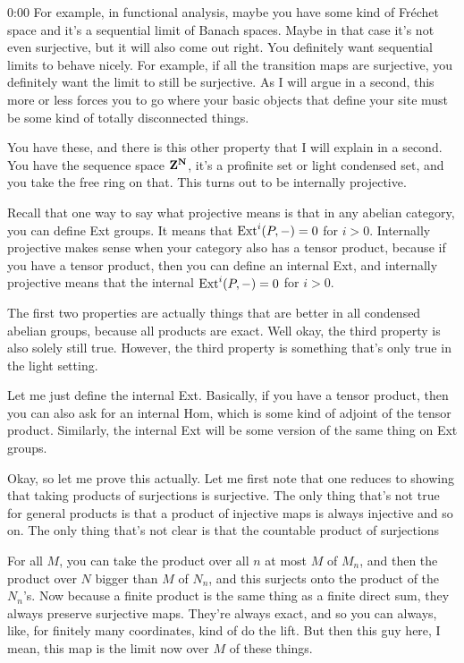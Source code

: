 \begin{unfinished}{0:00}
For example, in functional analysis, maybe you have some kind of Fréchet space and it's a sequential limit of Banach spaces. Maybe in that case it's not even surjective, but it will also come out right. You definitely want sequential limits to behave nicely. For example, if all the transition maps are surjective, you definitely want the limit to still be surjective. As I will argue in a second, this more or less forces you to go where your basic objects that define your site must be some kind of totally disconnected things.

You have these, and there is this other property that I will explain in a second. You have the sequence space $\mathbf Z^\mathbf N$, it's a profinite set or light condensed set, and you take the free ring on that. This turns out to be internally projective.

Recall that one way to say what projective means is that in any abelian category, you can define Ext groups. It means that $\operatorname{Ext}^i(P,-)=0$ for $i>0$. Internally projective makes sense when your category also has a tensor product, because if you have a tensor product, then you can define an internal Ext, and internally projective means that the internal $\operatorname{Ext}^i(P,-)=0$ for $i>0$.

The first two properties are actually things that are better in all condensed abelian groups, because all products are exact. Well okay, the third property is also solely still true. However, the third property is something that's only true in the light setting.

Let me just define the internal Ext. Basically, if you have a tensor product, then you can also ask for an internal Hom, which is some kind of adjoint of the tensor product. Similarly, the internal Ext will be some version of the same thing on Ext groups.

Okay, so let me prove this actually. Let me first note that one reduces to showing that taking products of surjections is surjective. The only thing that's not true for general products is that a product of injective maps is always injective and so on. The only thing that's not clear is that the countable product of surjections

For all $M$, you can take the product over all $n$ at most $M$ of $M_n$, and then the product over $N$ bigger than $M$ of $N_n$, and this surjects onto the product of the $N_n$'s. Now because a finite product is the same thing as a finite direct sum, they always preserve surjective maps. They're always exact, and so you can always, like, for finitely many coordinates, kind of do the lift. But then this guy here, I mean, this map is the limit now over $M$ of these things.


\end{unfinished}
